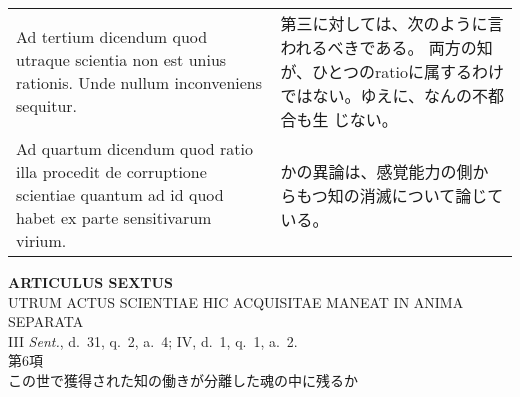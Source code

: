 \documentclass[10pt]{jsarticle} %
\begin{document}
\begin{longtable}{p{21em}p{21em}}
\\


Ad tertium dicendum quod utraque scientia
non est unius rationis. Unde nullum inconveniens sequitur.


&

第三に対しては、次のように言われるべきである。
両方の知が、ひとつのratioに属するわけではない。ゆえに、なんの不都合も生
 じない。

\\


{\sc Ad quartum dicendum} quod ratio illa procedit
de corruptione scientiae quantum ad id quod habet ex parte sensitivarum
virium.

&

かの異論は、感覚能力の側からもつ知の消滅について論じている。



\end{longtable}


\newpage
{}

\begin{center}
 {\Large {\bf ARTICULUS SEXTUS}}\\
 {\large UTRUM ACTUS SCIENTIAE HIC ACQUISITAE MANEAT IN ANIMA SEPARATA}\\
 {\footnotesize III {\it Sent.}, d.~31, q.~2, a.~4; IV, d.~1, q.~1,
 a.~2.}\\
 {\Large 第6項\\この世で獲得された知の働きが分離した魂の中に残るか}
\end{center}
\end{document}
